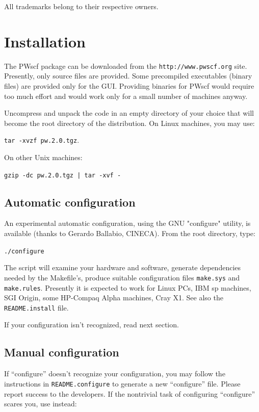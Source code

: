 \documentclass[12pt]{article}
\def\version{2.0}
\begin{document}
\vfill

All trademarks belong to their respective owners.

\newpage

\section{Installation}

The PWscf package can be downloaded from the {\tt http://www.pwscf.org}
site. Presently, only source files are provided. Some precompiled 
executables (binary files) are provided only for the GUI. Providing
binaries for PWscf would require too much effort and would work only 
for a small number of machines anyway.

Uncompress and unpack the code in an empty directory of your choice that
will become the root directory of the distribution.  On Linux machines,
you may use:

{\tt tar -xvzf pw.\version.tgz}.

\noindent On other Unix machines:

{\tt gzip -dc pw.\version.tgz | tar -xvf -}

\subsection{Automatic configuration}

An experimental automatic configuration, using the GNU "configure"
utility, is available (thanks to Gerardo Ballabio, CINECA).  From the
root directory, type:

{\tt ./configure}

\noindent 
The script will examine your hardware and software, generate
dependencies needed by the Makefile's, produce suitable configuration
files {\tt make.sys} and {\tt make.rules}.  Presently it is expected
to work for Linux PCs, IBM sp machines, SGI Origin, some HP-Compaq
Alpha machines, Cray X1.  See also the {\tt README.install} file.

If your configuration isn't recognized, read next section.

\subsection{Manual configuration}

If ``configure'' doesn't recognize your configuration, you may follow
the instructions in {\tt README.configure} to generate a new 
``configure'' file. Please report success to the developers. If
the nontrivial task of configuring ``configure'' scares you, use 
instead:
\end{document}
